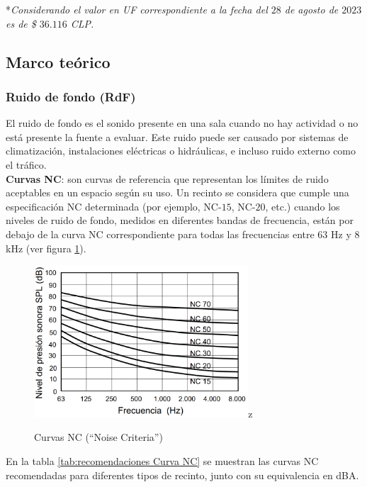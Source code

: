 *\textit{Considerando el valor en UF correspondiente a la fecha del $28$ de agosto de $2023$ es de \$ $36.116$ CLP.}


\subsection{Marco teórico}
\subsubsection{Ruido de fondo (RdF)}
El ruido de fondo es el sonido presente en una sala cuando no hay actividad o no está presente la fuente a evaluar. Este ruido puede ser causado por sistemas de climatización, instalaciones eléctricas o hidráulicas, e incluso ruido externo como el tráfico.\\
\textbf{Curvas NC}: son curvas de referencia que representan los límites de ruido aceptables en un espacio según su uso. Un recinto se considera que cumple una especificación NC determinada (por ejemplo, NC-$15$, NC-$20$, etc.) cuando los niveles de ruido de fondo, medidos en diferentes bandas de frecuencia, están por debajo de la curva NC correspondiente para todas las frecuencias entre $63$ Hz y $8$ kHz (ver figura \ref{fig:curvas NC}).\cite{carrion1990diseno}
    \begin{figure}[H]
        \centering
        \includegraphics[width=8cm]{Imagenes/MarcoTeorico/CurvaNC.png}z
        \caption{Curvas NC (``Noise Criteria'')}
        \label{fig:curvas NC}
    \end{figure}
 En la tabla \ref{tab:recomendaciones Curva NC} se muestran las curvas NC recomendadas para diferentes tipos de recinto, junto con su equivalencia en dBA.
